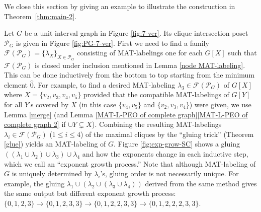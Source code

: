 \documentclass[ALCO, Unicode,published]{cedram}
\newcommand{\F}{\mathcal{F}}
\newcommand{\mcP}{\mathcal{P}}
\begin{document}
We close this section by giving an example to illustrate the construction in Theorem~\ref{thm:main-2}. 
\begin{example}
\label{ex:7}  
Let $G$ be a unit interval graph in Figure \ref{fig:7-ver}. Its clique intersection poset $\mcP_G$ is given in  Figure \ref{fig:PG-7-ver}. 
First we need to find a family $\F(\mathcal{P}_{G})= \{\lambda_{X}\}_{X \in \mathcal{P}_{G}} $ consisting of MAT-labelings one for each $ G[X] $ such that $\F(\mathcal{P}_{G})$ is closed under inclusion mentioned in Lemma \ref{node MAT-labeling}. 
This can be done inductively from the bottom to top starting from the minimum element $\hat{0}$. 
For example, to find a desired MAT-labeling $\lambda_3 \in \F(\mathcal{P}_{G})$ of $G[X]$ where $X=\{v_2,v_3,v_4, v_5\}$ provided that the compatible MAT-labelings of $G[Y]$ for all $Y$'s covered by $X$ (in this case $\{v_4, v_5\}$ and $\{v_2,v_3,v_4\}$) were given, we use Lemma \ref{merge} (and Lemma \ref{MAT-L-PEO of complete graph}\ref{MAT-L-PEO of complete graph 2} if $\cup Y \subsetneq X$). 
Combining the resulting MAT-labelings $\lambda_i\in \F(\mathcal{P}_{G})$ ($1 \le i \le 4$) of the maximal cliques by the   ``gluing trick'' (Theorem \ref{glue}) yields an MAT-labeling of $G$. 
Figure \ref{fig:exp-grow-SC} shows a gluing $((\lambda_1\cup \lambda_2) \cup \lambda_3)\cup \lambda_4$ and how the exponents change in each inductive step, which we call an ``exponent growth process.'' 
Note that although MAT-labeling of $G$ is uniquely determined by $\lambda_i$'s, gluing order is not necessarily unique. 
For example, the gluing $\lambda_1\cup (\lambda_2 \cup (\lambda_3\cup \lambda_4))$ derived from the same method gives the same output but different exponent growth process: $\{0,1,2,3\} \to \{0,1,2,3,3\} \to \{0,1,2,2,3,3\} \to \{0,1,2,2,2,3,3\}$.
\end{example}
\end{document}
